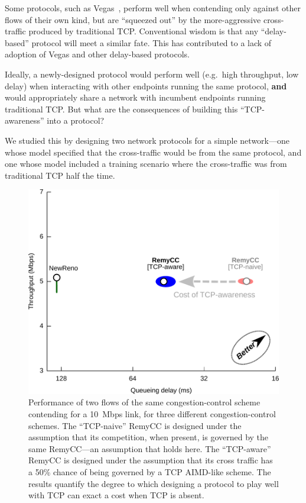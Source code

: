 Some protocols, such as Vegas~\cite{vegas}, perform well when
contending only against other flows of their own kind, but are
``squeezed out'' by the more-aggressive cross-traffic produced by
traditional TCP. Conventional wisdom is that any ``delay-based''
protocol will meet a similar fate. This has contributed to a lack of
adoption of Vegas and other delay-based protocols.

Ideally, a newly-designed protocol would perform well (e.g.~high
throughput, low delay) when interacting with other endpoints running
the same protocol, \textbf{and} would appropriately share a network
with incumbent endpoints running traditional TCP. But what are the
consequences of building this ``TCP-awareness'' into a protocol?

We studied this by designing two network protocols for a simple
network---one whose model specified that the cross-traffic would be
from the same protocol, and one whose model included a training
scenario where the cross-traffic was from traditional TCP half the
time.

\begin{figure}
\caption{Performance of two flows of the same congestion-control
  scheme contending for a 10~Mbps link, for three different
  congestion-control schemes. The ``TCP-naive'' RemyCC is designed
  under the assumption that its competition, when present, is governed
  by the same RemyCC---an assumption that holds here. The
  ``TCP-aware'' RemyCC is designed under the assumption that its cross
  traffic has a 50\% chance of being governed by a TCP AIMD-like
  scheme. The results quantify the degree to which designing a
  protocol to play well with TCP can exact a cost when TCP is absent.}
\label{fig:tcphomog}
\begin{center}
\includegraphics[width=\textwidth]{homo-3.pdf}
\end{center}
\label{fig:tcpawarehomo}
\end{figure}

